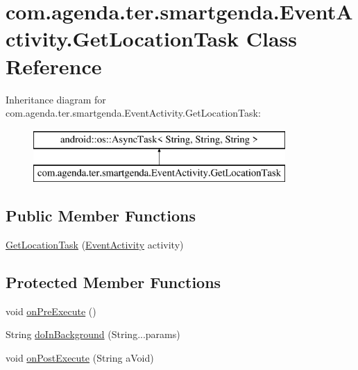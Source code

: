 \hypertarget{classcom_1_1agenda_1_1ter_1_1smartgenda_1_1_event_activity_1_1_get_location_task}{\section{com.\-agenda.\-ter.\-smartgenda.\-Event\-Activity.\-Get\-Location\-Task Class Reference}
\label{classcom_1_1agenda_1_1ter_1_1smartgenda_1_1_event_activity_1_1_get_location_task}
}
Inheritance diagram for com.\-agenda.\-ter.\-smartgenda.\-Event\-Activity.\-Get\-Location\-Task\-:\begin{figure}[H]
\begin{center}
\leavevmode
\includegraphics[height=2.000000cm]{classcom_1_1agenda_1_1ter_1_1smartgenda_1_1_event_activity_1_1_get_location_task}
\end{center}
\end{figure}
\subsection*{Public Member Functions}
\begin{DoxyCompactItemize}
\item 
\hyperlink{classcom_1_1agenda_1_1ter_1_1smartgenda_1_1_event_activity_1_1_get_location_task_af68954a723173ee37b87c5c7a00cace1}{Get\-Location\-Task} (\hyperlink{classcom_1_1agenda_1_1ter_1_1smartgenda_1_1_event_activity}{Event\-Activity} activity)
\end{DoxyCompactItemize}
\subsection*{Protected Member Functions}
\begin{DoxyCompactItemize}
\item 
void \hyperlink{classcom_1_1agenda_1_1ter_1_1smartgenda_1_1_event_activity_1_1_get_location_task_a8f2b6f89664174fab99bbdc0825146fe}{on\-Pre\-Execute} ()
\item 
String \hyperlink{classcom_1_1agenda_1_1ter_1_1smartgenda_1_1_event_activity_1_1_get_location_task_a8d950547a656ed2c6bbba4a5fb36fca8}{do\-In\-Background} (String...\-params)
\item 
void \hyperlink{classcom_1_1agenda_1_1ter_1_1smartgenda_1_1_event_activity_1_1_get_location_task_a0a473dbeed3680bb018b8527d3495f62}{on\-Post\-Execute} (String a\-Void)
\end{DoxyCompactItemize}


